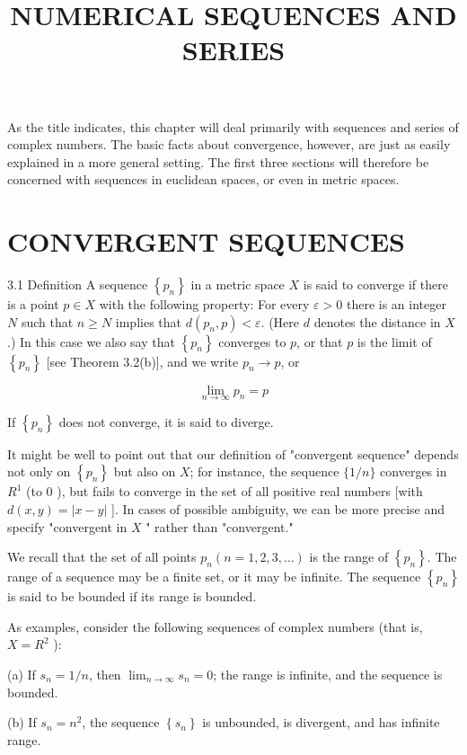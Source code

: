 \documentclass[10pt]{article}
\title{NUMERICAL SEQUENCES AND SERIES }
\author{}
\date{}
\begin{document}
\maketitle
As the title indicates, this chapter will deal primarily with sequences and series of complex numbers. The basic facts about convergence, however, are just as easily explained in a more general setting. The first three sections will therefore be concerned with sequences in euclidean spaces, or even in metric spaces.

\section{CONVERGENT SEQUENCES}
3.1 Definition A sequence $\left\{p_{n}\right\}$ in a metric space $X$ is said to converge if there is a point $p \in X$ with the following property: For every $\varepsilon>0$ there is an integer $N$ such that $n \geq N$ implies that $d\left(p_{n}, p\right)<\varepsilon$. (Here $d$ denotes the distance in $X$.) In this case we also say that $\left\{p_{n}\right\}$ converges to $p$, or that $p$ is the limit of $\left\{p_{n}\right\}$ [see Theorem 3.2(b)], and we write $p_{n} \rightarrow p$, or

$$
\lim _{n \rightarrow \infty} p_{n}=p
$$

If $\left\{p_{n}\right\}$ does not converge, it is said to diverge.

It might be well to point out that our definition of "convergent sequence" depends not only on $\left\{p_{n}\right\}$ but also on $X$; for instance, the sequence $\{1 / n\}$ converges in $R^{1}$ (to 0 ), but fails to converge in the set of all positive real numbers [with $d(x, y)=|x-y|$ ]. In cases of possible ambiguity, we can be more precise and specify "convergent in $X$ " rather than "convergent."

We recall that the set of all points $p_{n}(n=1,2,3, \ldots)$ is the range of $\left\{p_{n}\right\}$. The range of a sequence may be a finite set, or it may be infinite. The sequence $\left\{p_{n}\right\}$ is said to be bounded if its range is bounded.

As examples, consider the following sequences of complex numbers (that is, $X=R^{2}$ ):

(a) If $s_{n}=1 / n$, then $\lim _{n \rightarrow \infty} s_{n}=0$; the range is infinite, and the sequence is bounded.

(b) If $s_{n}=n^{2}$, the sequence $\left\{s_{n}\right\}$ is unbounded, is divergent, and has infinite range.
\end{document}
